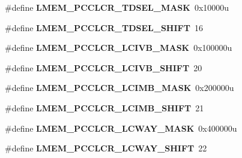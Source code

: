 \begin{DoxyCompactItemize}
\item 
\hypertarget{group___l_m_e_m___register___masks_ga170365be81884aa29ccd3633d5a45a75}{}\#define {\bfseries L\+M\+E\+M\+\_\+\+P\+C\+C\+L\+C\+R\+\_\+\+T\+D\+S\+E\+L\+\_\+\+M\+A\+S\+K}~0x10000u\label{group___l_m_e_m___register___masks_ga170365be81884aa29ccd3633d5a45a75}

\item 
\hypertarget{group___l_m_e_m___register___masks_ga17e2604e6b243c501d1a25f56e537d7c}{}\#define {\bfseries L\+M\+E\+M\+\_\+\+P\+C\+C\+L\+C\+R\+\_\+\+T\+D\+S\+E\+L\+\_\+\+S\+H\+I\+F\+T}~16\label{group___l_m_e_m___register___masks_ga17e2604e6b243c501d1a25f56e537d7c}

\item 
\hypertarget{group___l_m_e_m___register___masks_ga742b13f0ab265cf53d020b7215bd9a3f}{}\#define {\bfseries L\+M\+E\+M\+\_\+\+P\+C\+C\+L\+C\+R\+\_\+\+L\+C\+I\+V\+B\+\_\+\+M\+A\+S\+K}~0x100000u\label{group___l_m_e_m___register___masks_ga742b13f0ab265cf53d020b7215bd9a3f}

\item 
\hypertarget{group___l_m_e_m___register___masks_ga8405b133aaa949814d6085e769f89205}{}\#define {\bfseries L\+M\+E\+M\+\_\+\+P\+C\+C\+L\+C\+R\+\_\+\+L\+C\+I\+V\+B\+\_\+\+S\+H\+I\+F\+T}~20\label{group___l_m_e_m___register___masks_ga8405b133aaa949814d6085e769f89205}

\item 
\hypertarget{group___l_m_e_m___register___masks_ga9dbf4c3b1eec85318c613ca681dd5903}{}\#define {\bfseries L\+M\+E\+M\+\_\+\+P\+C\+C\+L\+C\+R\+\_\+\+L\+C\+I\+M\+B\+\_\+\+M\+A\+S\+K}~0x200000u\label{group___l_m_e_m___register___masks_ga9dbf4c3b1eec85318c613ca681dd5903}

\item 
\hypertarget{group___l_m_e_m___register___masks_gaeaff5efd18f7928e11c8221b1f1a0fb4}{}\#define {\bfseries L\+M\+E\+M\+\_\+\+P\+C\+C\+L\+C\+R\+\_\+\+L\+C\+I\+M\+B\+\_\+\+S\+H\+I\+F\+T}~21\label{group___l_m_e_m___register___masks_gaeaff5efd18f7928e11c8221b1f1a0fb4}

\item 
\hypertarget{group___l_m_e_m___register___masks_gacc9a4885c3e5d23fa9899897fad2bd86}{}\#define {\bfseries L\+M\+E\+M\+\_\+\+P\+C\+C\+L\+C\+R\+\_\+\+L\+C\+W\+A\+Y\+\_\+\+M\+A\+S\+K}~0x400000u\label{group___l_m_e_m___register___masks_gacc9a4885c3e5d23fa9899897fad2bd86}

\item 
\hypertarget{group___l_m_e_m___register___masks_gaa3bc3215e9b41f87c2c4aca39f7f9490}{}\#define {\bfseries L\+M\+E\+M\+\_\+\+P\+C\+C\+L\+C\+R\+\_\+\+L\+C\+W\+A\+Y\+\_\+\+S\+H\+I\+F\+T}~22\label{group___l_m_e_m___register___masks_gaa3bc3215e9b41f87c2c4aca39f7f9490}


\end{DoxyCompactItemize}
